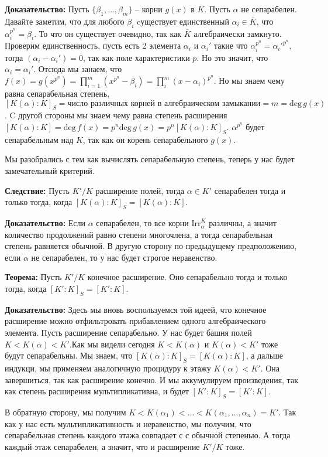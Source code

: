 \documentclass[a4paper, 12pt]{book}
\begin{document}
\textbf{Доказательство:} Пусть $\{\beta_1,\ldots,\beta_m\}$ – корни $g(x)$ в
$\overline K$. Пусть $\alpha$ не сепарабелен. Давайте заметим, что для любого
$\beta_i$ cуществует единственный $\alpha_i\in\overline K$, что $\alpha_i^{p^n}
=\beta_i$. То что он существует очевидно, так как $\overline K$ алгебраически
замкнуто. Проверим единственность, пусть есть 2 элемента $\alpha_i$ и $\alpha_i'$
такие что $\alpha_i^{p^n}=\alpha_i'^{p^n}$, тогда $(\alpha_i-\alpha_i')=0$, так
как поле характеристики $p$. Но это значит, что $\alpha_i = \alpha_i'$. Отсюда
мы занаем, что $f(x)=g(x^{p^n})=\prod_{i=1}^m(x^{p^n}-\beta_i)=\prod_i^m(x-
\alpha_i)^{p^n}$. Но мы знаем чему равна сепарабельная степень, $[K(\alpha):K]
_S=\text{число различных корней в алгебраическом замыкании}=m=\text{deg}\,g(x)$.
C другой стороны мы знаем чему равна степень расширения $[K(\alpha):K]=\text{deg}
\,f(x)=p^n\text{deg}\,g(x)=p^n[K(\alpha):K]_S$. $\alpha^{p^n}$ будет
сепарабельным над $K$, так как он корень сепарабельного $g(x)$.

Мы разобрались с тем как вычислять сепарабельную степень, теперь у нас будет
замечательный критерий.

\textbf{Следствие:} Пусть $K'/K$ расширение полей, тогда $\alpha\in K'$
сепарабелен тогда и только тогда, когда $[K(\alpha):K]_S=[K(\alpha):K]$.

\textbf{Доказательство:} Если $\alpha$ сепарабелен, то все корни
$\text{Irr}_\alpha^K$ различны, а значит количество продолжений равно степени
многочлена, а тогда сепарабельная степень равняется обычной. В другую сторону
по предыдущему предположению, если $\alpha$ не сепарабелен, то у нас будет
строгое неравенство.

\textbf{Теорема:} Пусть $K'/K$ конечное расширение. Оно сепарабельно тогда и
только тогда, когда $[K':K]_S=[K':K]$.

\textbf{Доказательство:} Здесь мы вновь воспользуемся той идеей, что конечное
расширение можно отфильтровать прибавлением одного алгебраического элемента.
Пусть расширение сепарабельно. У нас будет башня полей $K<K(\alpha)<K'$.Как мы 
видели сегодня $K<K(\alpha)$ и $K(\alpha)<K'$ тоже будут сепарабельны. Мы знаем,
что $[K(\alpha):K]_S=[K(\alpha):K]$, а дальше индукци, мы применяем аналогичную
процидуру к этажу $K(\alpha)<K'$. Она завершиться, так как расширение конечно.
И мы аккумулируем произведения, так как степень расширения мультипликативна, и
будет $[K':K]_S=[K':K]$.

В обратную сторону, мы получим $K<K(\alpha_1)<\ldots<K(\alpha_1,\ldots,\alpha_n)=K'$.
Так как у нас есть мультипликативность и неравенство, мы получим, что
сепарабельная степень каждого этажа совпадает с с обычной степенью. А тогда
каждый этаж сепарабелен, а значит, что и расширение $K'/K$ тоже.
\end{document}
